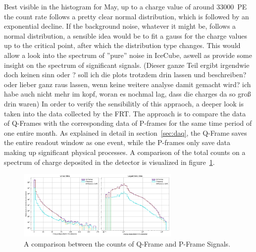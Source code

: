 Best visible in the histogram for May, up to a charge value of around \SI{33000}{PE} the count rate follows a pretty clear normal distribution, which is followed 
by an exponential decline. If the background noise, whatever it might be, follows a normal distribution, a sensible idea would be to fit a gauss for the charge 
values up to the critical point, after which the distribution type changes. This would allow a look into the spectrum of ''pure'' noise in IceCube, aswell as provide 
some insight on the spectrum of significant signals. (Dieser ganze Teil ergibt irgendwie doch keinen sinn oder ? soll ich die plots trotzdem drin lassen und 
beschreiben? oder lieber ganz raus lassen, wenn keine weitere analyse damit gemacht wird? ich habe auch nicht mehr im kopf, woran es nochmal lag, dass die charges
da so groß drin waren)
In order to verify the sensibilitly of this appraoch, a deeper look is taken into the data collected by the FRT. The approach is to compare the data of 
Q-Frames with the corresponding data of P-frames for the same time period of one entire month. As explained in detail in section~\ref{sec:daq}, the Q-Frame 
saves the entire readout window as one event, while the P-frames only save data making up significant physical processes. A comparison of the total counts on a 
spectrum of charge deposited in the detector is visualized in figure~\ref{fig:frt_mu_sub_comp}. 

\begin{figure}
    \centering
    \includegraphics[width=0.7\textwidth]{Plots/q_p_comp.pdf}
    \caption{A comparison between the counts of Q-Frame and P-Frame Signals.}
    \label{fig:frt_mu_sub_comp}
\end{figure}


